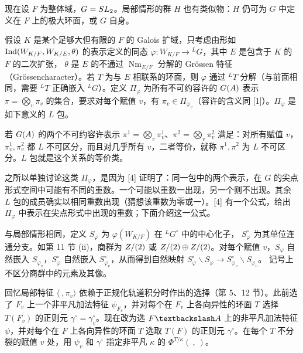 现在设 $F$ 为整体域，$G=SL_2$。局部情形的群 $H$ 也有类似物：$H$ 仍可为 $G$ 中定义在 $F$ 上的极大环面，或 $G$ 自身。

假设 $K$ 是某个足够大但有限的 $F$ 的 Galois 扩域，只考虑由形如
$\operatorname{Ind}(W_{K/F},W_{K/E},\theta)$ 的表示定义的同态
$\varphi:W_{K/F}\to{}^LG$，其中 $E$ 是包含于 $K$ 的 $F$ 的二次扩张，
$\theta$ 是 $E$ 的不通过 $\operatorname{Nm}_{E/F}$ 分解的 Grössen 特征（Grössencharacter）。若 $T$ 为与 $E$ 相联系的环面，则 $\varphi$ 通过 ${}^LT$ 分解（与前面相同，需要 ${}^LT$ 正确嵌入 ${}^LG$）。定义 $\Pi_\varphi$ 为所有不可约容许的
$G(A)$ 表示 $\pi=\bigotimes_v\pi_v$ 的集合，要求对每个赋值 $v$，有
$\pi_v\in\Pi_{\varphi_v}$（容许的含义同 [1]）。$\Pi_\varphi$ 是如下意义的 $L$ 包。

若 $G(A)$ 的两个不可约容许表示
$\pi^1=\bigotimes_v\pi_v^1$、$\pi^2=\bigotimes_v\pi_v^2$ 满足：对所有赋值 $v$，
$\pi_v^1,\pi_v^2$ 都 $L$ 不可区分，而且对几乎所有 $v$，二者等价，就称
$\pi^1,\pi^2$ 为 $L$ 不可区分。$L$ 包就是这个关系的等价类。

之所以单独讨论这类 $\Pi_\varphi$，是因为 [4] 证明了：同一包中的两个表示，在
$G$ 的尖点形式空间中可能有不同的重数。一个可能以重数一出现，另一个则不出现。其余 $L$ 包的成员确实以相同重数出现（猜想该重数为零或一）。[4] 有一个公式，给出
$\Pi_\varphi$ 中表示在尖点形式中出现的重数；下面介绍这一公式。

与局部情形相同，定义 $S_\varphi$ 为 $\varphi(W_{K/F})$ 在 ${}^LG^\circ$ 中的中心化子，
$S_\varphi^\circ$ 为其单位连通分支。如第 11 节 (ii)，商群为
$Z/(2)$ 或 $Z/(2)\oplus Z/(2)$。对每个赋值 $v$，$S_\varphi$ 自然嵌入
$S_{\varphi_v}$，$S_\varphi^\circ$ 自然嵌入 $S_{\varphi_v}^\circ$，从而得到自然映射
$S_\varphi^\circ\backslash S_\varphi\to S_{\varphi_v}^\circ\backslash S_{\varphi_v}$。
记号上不区分商群中的元素及其像。

回忆局部特征 $\langle\ ,\pi_v\rangle$ 依赖于正规化轨道积分时作出的选择（第 5、12 节）。此前选了 $F_v$ 上一个非平凡加法特征 $\psi_{F_v}$，并对每个在
$F_v$ 上各向异性的环面 $T$ 选择 $T(F_v)$ 的正则元
$\gamma^\circ=\gamma_v^\circ$。现在改为选 $F\backslash\A$ 上的非平凡加法特征 $\psi$，并对每个在 $F$ 上各向异性的环面 $T$ 选取
$T(F)$ 的正则元 $\gamma^\circ$。在每个 $T$ 不分裂的赋值 $v$ 处，用
$\psi_v$ 和 $\gamma^\circ$ 指定非平凡 $\kappa$ 的 $\Phi^{T/\kappa}(\ ,\ )$。


